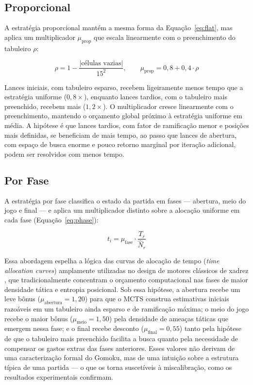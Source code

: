 \documentclass[cic,tc]{iiufrgs}
\begin{document}
\subsection{Proporcional}
\label{sec:strategy_proportional}

A estratégia proporcional mantém a mesma forma da Equação~\ref{eq:flat}, mas aplica um multiplicador $\mu_{\text{prop}}$ que escala linearmente com o preenchimento do tabuleiro $\rho$:

\begin{equation}
    \rho = 1 - \frac{|\text{células vazias}|}{15^2}, \qquad
    \mu_{\text{prop}} = 0{,}8 + 0{,}4 \cdot \rho
\label{eq:prop_preview}
\end{equation}

Lances iniciais, com tabuleiro esparso, recebem ligeiramente menos tempo que a estratégia uniforme ($0{,}8\times$), enquanto lances tardios, com o tabuleiro mais preenchido, recebem mais ($1{,}2\times$). O multiplicador cresce linearmente com o preenchimento, mantendo o orçamento global próximo à estratégia uniforme em média. A hipótese é que lances tardios, com fator de ramificação menor e posições mais definidas, se beneficiam de mais tempo, ao passo que lances de abertura, com espaço de busca enorme e pouco retorno marginal por iteração adicional, podem ser resolvidos com menos tempo.

\subsection{Por Fase}
\label{sec:strategy_phase}

A estratégia por fase classifica o estado da partida em fases — abertura, meio do jogo e final — e aplica um multiplicador distinto sobre a alocação uniforme em cada fase (Equação~\ref{eq:phase}):

\begin{equation}
    t_i = \mu_{\text{fase}} \cdot \frac{T_r}{\hat{N}_r}
\label{eq:phase}
\end{equation}

Essa abordagem espelha a lógica das curvas de alocação de tempo (\emph{time allocation curves}) amplamente utilizadas no design de motores clássicos de xadrez \cite{hyatt1984cray}, que tradicionalmente concentram o orçamento computacional nas fases de maior densidade tática e entropia posicional. Sob essa hipótese, a abertura recebe um leve bônus ($\mu_{\text{abertura}} = 1{,}20$) para que o MCTS construa estimativas iniciais razoáveis em um tabuleiro ainda esparso e de ramificação máxima; o meio do jogo recebe o maior bônus ($\mu_{\text{meio}} = 1{,}50$) pela densidade de ameaças táticas que emergem nessa fase; e o final recebe desconto ($\mu_{\text{final}} = 0{,}55$) tanto pela hipótese de que o tabuleiro mais preenchido facilita a busca quanto pela necessidade de compensar os gastos extras das fases anteriores. Esses valores não derivam de uma caracterização formal do Gomoku, mas de uma intuição sobre a estrutura típica de uma partida — o que os torna suscetíveis à miscalibração, como os resultados experimentais confirmam.
\end{document}
